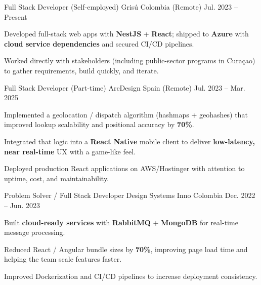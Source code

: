 \begin{cventries}
  \cventry
  {Full Stack Developer (Self-employed)}
  {Grisú}
  {Colombia (Remote)}
  {Jul. 2023 -- Present}
  {
    \begin{cvitems}
      \item {Developed full-stack web apps with \textbf{NestJS} + \textbf{React}; shipped to \textbf{Azure} with \textbf{cloud service dependencies} and secured CI/CD pipelines.}
      \item {Worked directly with stakeholders (including public-sector programs in Curaçao) to gather requirements, build quickly, and iterate.}
    \end{cvitems}
  }

  \cventry
  {Full Stack Developer (Part-time)}
  {ArcDesign}
  {Spain (Remote)}
  {Jul. 2023 -- Mar. 2025}
  {
    \begin{cvitems}
      \item {Implemented a geolocation / dispatch algorithm (hashmaps + geohashes) that improved lookup scalability and positional accuracy by \textbf{70\%}.}
      \item {Integrated that logic into a \textbf{React Native} mobile client to deliver \textbf{low-latency, near real-time} UX with a game-like feel.}
      \item {Deployed production React applications on AWS/Hostinger with attention to uptime, cost, and maintainability.}
    \end{cvitems}
  }

  \cventry
  {Problem Solver / Full Stack Developer}
  {Design Systems Inno}
  {Colombia}
  {Dec. 2022 -- Jun. 2023}
  {
    \begin{cvitems}
      \item {Built \textbf{cloud-ready services} with \textbf{RabbitMQ} + \textbf{MongoDB} for real-time message processing.}
      \item {Reduced React / Angular bundle sizes by \textbf{70\%}, improving page load time and helping the team scale features faster.}
      \item {Improved Dockerization and CI/CD pipelines to increase deployment consistency.}
    \end{cvitems}
  }


\end{cventries}
